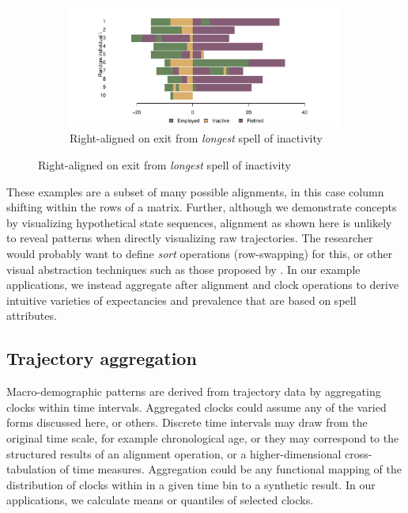 \documentclass[a4paper,left=1.25cm,right=1.25cm,top=1.25cm,bottom=1.25cm]{article}
\begin{document}
\begin{figure}[ht!]
\begin{subfigure}{\textwidth}
\centering
\caption{Right-aligned on exit from \emph{longest} spell of inactivity}
\label{fig:longinactright}
\includegraphics[scale=.5]{Figures/Seq10inactlongright.pdf}
\end{subfigure}

\end{figure}

These examples are a subset of many possible alignments, in this case column shifting within the rows of a matrix. Further, although we demonstrate concepts by visualizing hypothetical state sequences, alignment as shown here is unlikely to reveal patterns when directly visualizing raw trajectories. The researcher would probably want to define \emph{sort} operations (row-swapping) for this, or other visual abstraction techniques such as those proposed by \citet[e.g.][]{fasang2014visualizing}. In our example applications, we instead aggregate after alignment and clock operations to derive intuitive varieties of expectancies and prevalence that are based on spell attributes.

\FloatBarrier
\subsection{Trajectory aggregation}
Macro-demographic patterns are derived from trajectory data by aggregating clocks within time intervals. Aggregated clocks could assume any of the varied forms discussed here, or others. Discrete time intervals may draw from the original time scale, for example chronological age, or they may correspond to the structured results of an alignment operation, or a higher-dimensional cross-tabulation of time measures. Aggregation could be any functional mapping of the distribution of clocks within in a given time bin to a synthetic result. In our applications, we calculate means or quantiles of selected clocks.
\end{document}
